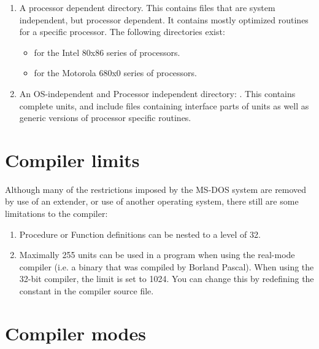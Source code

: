 {\begin{enumerate}
\begin{itemize}
\item {} for unix common interfaces (used for easier porting).
\end{itemize}
\item A processor dependent directory. This contains files that are system
independent, but processor dependent. It contains mostly optimized routines
for a specific processor. The following directories exist:
\begin{itemize}
\item {} for the Intel 80x86 series of processors.
\item {} for the Motorola 680x0 series of processors.
\end{itemize}
\item An OS-independent and Processor independent directory: . This
contains complete units, and include files containing interface parts of
units as well as generic versions of processor specific routines.
\end{enumerate}


\chapter{Compiler limits}
\label{ch:AppC}
Although many of the restrictions imposed by the MS-DOS system are removed
by use of an extender, or use of another operating system, there still are
some limitations to the compiler:
\begin{enumerate}
\item Procedure or Function definitions can be nested to a level of 32.
\item Maximally 255 units can be used in a program when using the real-mode
compiler (i.e. a binary that was compiled by Borland Pascal). When using the 32-bit compiler, the limit is set to 1024. You can
change this by redefining the  constant in the
 compiler source file.
\end{enumerate}

\chapter{Compiler modes}
\label{ch:AppD}

}
